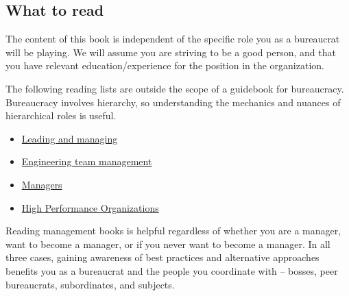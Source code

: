 \subsection{What to read\label{sec:to_read}}

The content of this book is independent of the specific role you as a bureaucrat will be playing. We will assume you are striving to be a good person, and that you have relevant education/experience for the position in the organization.

The following reading lists are outside the scope of a guidebook for bureaucracy. Bureaucracy involves hierarchy, so understanding the mechanics and nuances of hierarchical roles is useful. 
\begin{itemize}
    \item \href{https://github.com/LappleApple/awesome-leading-and-managing}{Leading and managing}
    \item \href{https://github.com/kdeldycke/awesome-engineering-team-management}{Engineering team management}
    \item \href{https://github.com/ankitjaininfo/awesome-managers}{Managers}
    \item \href{https://github.com/pdfernhout/High-Performance-Organizations-Reading-List}{High Performance Organizations}
\end{itemize}

Reading management books is helpful regardless of whether you are a manager, want to become a manager, or if you never want to become a manager. In all three cases, gaining awareness of best practices and alternative approaches benefits you as a bureaucrat and the people you coordinate with -- bosses, peer bureaucrats, subordinates, and subjects.
